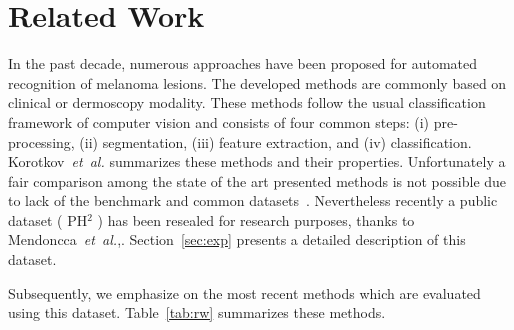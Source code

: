 \section{Related Work}
\label{sec:rw}
In the past decade, numerous approaches have been proposed for automated recognition of melanoma lesions.
The developed methods are commonly based on clinical or dermoscopy modality.
These methods follow the usual classification framework of computer vision and consists of four common steps: (i) pre-processing, (ii) segmentation, (iii) feature extraction, and (iv) classification.
Korotkov~\emph{et~al.}\cite{korotkov2012computerized} summarizes these methods and their properties.
Unfortunately a fair comparison among the state of the art presented methods is not possible due to lack of the benchmark and common datasets~\cite{rastgoo2015automatic,korotkov2012computerized}.
Nevertheless recently a public dataset ( PH$^{2}$ ) has been resealed for research purposes, thanks to Mendoncca~\emph{et~al.}\cite{mendoncca2013ph},.
Section~\ref{sec:exp} presents a detailed description of this dataset.

Subsequently, we emphasize on the most recent methods which are evaluated using this dataset.
Table~\ref{tab:rw} summarizes these methods.

